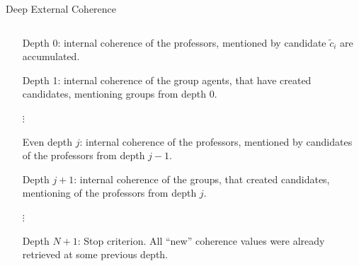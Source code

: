 \documentclass{beamer}
\providecommand{\rootdir}{../doc}
\begin{document}
\begin{frame}{Deep External Coherence}
  \begin{columns}
    \begin{column}{.8\textwidth}
      \begin{itemize}
        \item[Depth 0:] internal coherence of the professors,
                  mentioned by candidate $\tilde{c}_i$ are accumulated.
        \item[Depth 1:] internal coherence of the group agents,
                  that have created candidates, mentioning groups from depth 0.
        \item[$\vdots$]
        \item[Even depth $j$:] internal coherence of the professors,
                  mentioned by candidates of the professors from depth $j-1$.
        \item[Depth $j+1$:] internal coherence of the groups,
                  that created candidates, mentioning of the professors from depth $j$.
        \item[$\vdots$]
        \item[Depth $N+1$:] Stop criterion.
                  All ``new'' coherence values were already retrieved at some previous depth.
      \end{itemize}
    \end{column}
  \end{columns}
\end{frame}



\end{document}

